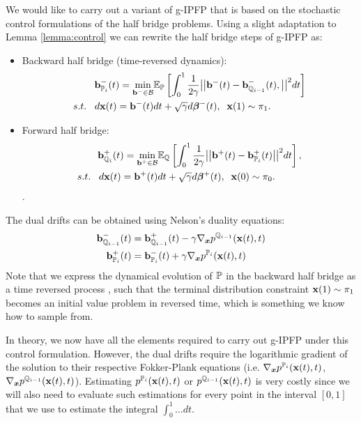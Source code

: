 \documentclass[a4paper,12pt,twoside,openright]{report}
\theoremstyle{definition}
\begin{document}
We would like to carry out a variant of g-IPFP that is based on the stochastic control formulations of the half bridge problems. Using a slight adaptation to Lemma \ref{lemma:control} we can rewrite the half bridge steps of g-IPFP as:
\begin{itemize}
\item Backward half bridge (time-reversed dynamics): 
\begin{align} \label{eq:controlled_haalf_bridge_forward}
  \rvb^{-}_{\P_{i}}(t) = \min_{\rvb^{-} \in \calB }  &\E_\P\left[\int_0^1 \frac{1}{2\gamma}\big|\big|\rvb^{-}(t) -\rvb^{-}_{\Q_{i-1}}(t), \big|\big|^2 dt\right] \nonumber \\
    s.t.\;\;\; d\rvx(t) = \rvb^{-}(t) &dt + \sqrt{\gamma} d\rvw^{-}(t), \;\; \rvx(1) \sim \pi_1.
\end{align}
\item Forward half bridge:
\begin{align} \label{eq:controlled_half_bridge_backward}
   \rvb^{+}_{\Q_{i}}(t) =\min_{\rvb^{+} \in \calB } & \E_\Q\left[\int_0^1 \frac{1}{2\gamma}\big|\big|\rvb^{+}(t) -\rvb^{+}_{\P_{i}}(t)\big|\big|^2 dt\right], \nonumber \\
    s.t.\;\;\; d\rvx(t) = \rvb^{+}(t) &dt + \sqrt{\gamma} d\rvw^{+}(t), \;\; \rvx(0) \sim \pi_0.
\end{align}.
\end{itemize}
The dual drifts can be obtained using Nelson's duality equations:
\begin{align*}
      \rvb^{-}_{\Q_{i-1}}(t)   &=\rvb^{+}_{\Q_{i-1}}(t) -\gamma\nabla_{\vx} p^{\Q_{i-1}}(\rvx(t), t) \\
    \rvb^{+}_{\P_{i}}(t) &=  \rvb^{-}_{\P_{i}}(t) +\gamma\nabla_{\vx} p^{\P_{i}}(\rvx(t), t)
\end{align*}
Note that we express the dynamical evolution of $\P$ in the backward half bridge as a time reversed process \citep{pavon1991free, nelson1967dynamical}, such that the terminal distribution constraint $\rvx(1) \sim \pi_1$ becomes an initial value problem in reversed time, which is something we know how to sample from. 

In theory, we now have all the elements required to carry out g-IPFP under this control formulation. However, the dual drifts require the logarithmic gradient of the solution to their respective Fokker-Plank equations (i.e. $\nabla_{\vx} p^{\P_{i}}(\rvx(t), t)$, $\nabla_{\vx} p^{\Q_{i-1}}(\rvx(t), t)$). Estimating $p^{\P_{i}}(\rvx(t), t)$ or $p^{\Q_{i-1}}(\rvx(t), t)$ is very costly since we will also need to evaluate such estimations for every point in the interval $[0,1]$ that we use to estimate the integral $\int_0^1 \hdots dt$.
\end{document}
